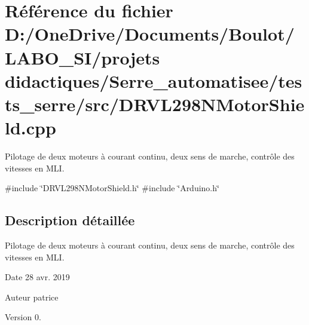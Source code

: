 \section{Référence du fichier D\+:/\+One\+Drive/\+Documents/\+Boulot/\+L\+A\+B\+O\+\_\+\+S\+I/projets didactiques/\+Serre\+\_\+automatisee/tests\+\_\+serre/src/\+D\+R\+V\+L298\+N\+Motor\+Shield.cpp}
\label{_d_r_v_l298_n_motor_shield_8cpp}


Pilotage de deux moteurs à courant continu, deux sens de marche, contrôle des vitesses en M\+LI.  


{\ttfamily \#include \char`\"{}D\+R\+V\+L298\+N\+Motor\+Shield.\+h\char`\"{}}\newline
{\ttfamily \#include \char`\"{}Arduino.\+h\char`\"{}}\newline


\subsection{Description détaillée}
Pilotage de deux moteurs à courant continu, deux sens de marche, contrôle des vitesses en M\+LI. 

\begin{DoxyDate}{Date}
28 avr. 2019 
\end{DoxyDate}
\begin{DoxyAuthor}{Auteur}
patrice 
\end{DoxyAuthor}
\begin{DoxyVersion}{Version}
0. 
\end{DoxyVersion}

